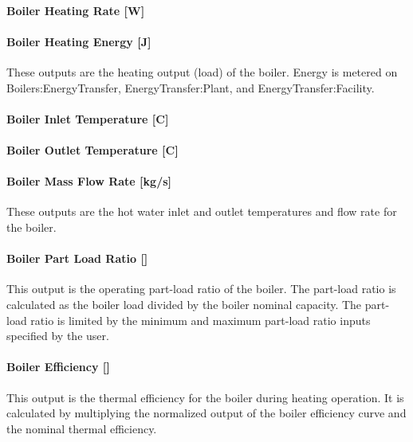 \paragraph{Boiler Heating Rate {[}W{]}}\label{boiler-heating-rate-w}

\paragraph{Boiler Heating Energy {[}J{]}}\label{boiler-heating-energy-j}

These outputs are the heating output (load) of the boiler. Energy is metered on Boilers:EnergyTransfer, EnergyTransfer:Plant, and EnergyTransfer:Facility.

\paragraph{Boiler Inlet Temperature {[}C{]}}\label{boiler-inlet-temperature-c}

\paragraph{Boiler Outlet Temperature {[}C{]}}\label{boiler-outlet-temperature-c}

\paragraph{Boiler Mass Flow Rate {[}kg/s{]}}\label{boiler-mass-flow-rate-kgs}

These outputs are the hot water inlet and outlet temperatures and flow rate for the boiler.

\paragraph{Boiler Part Load Ratio {[]}}\label{boiler-part-load-ratio}

This output is the operating part-load ratio of the boiler. The part-load ratio is calculated as the boiler load divided by the boiler nominal capacity. The part-load ratio is limited by the minimum and maximum part-load ratio inputs specified by the user.

\paragraph{Boiler Efficiency {[]}}\label{boiler-efficiency}

This output is the thermal efficiency for the boiler during heating operation. It is calculated by multiplying the normalized output of the boiler efficiency curve and the nominal thermal efficiency.

